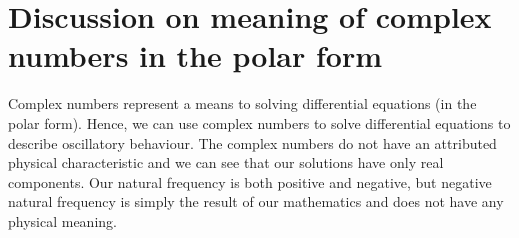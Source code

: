 \documentclass[11pt]{article}
\begin{document}
\section{Discussion on meaning of complex numbers in the polar form}
Complex numbers represent a means to solving differential equations (in the polar form). Hence, we can use complex numbers to solve differential equations to describe oscillatory behaviour. The complex numbers do not have an attributed physical characteristic and we can see that our solutions have only real components. Our natural frequency is both positive and negative, but negative natural frequency is simply the result of our mathematics and does not have any physical meaning.
\end{document}
